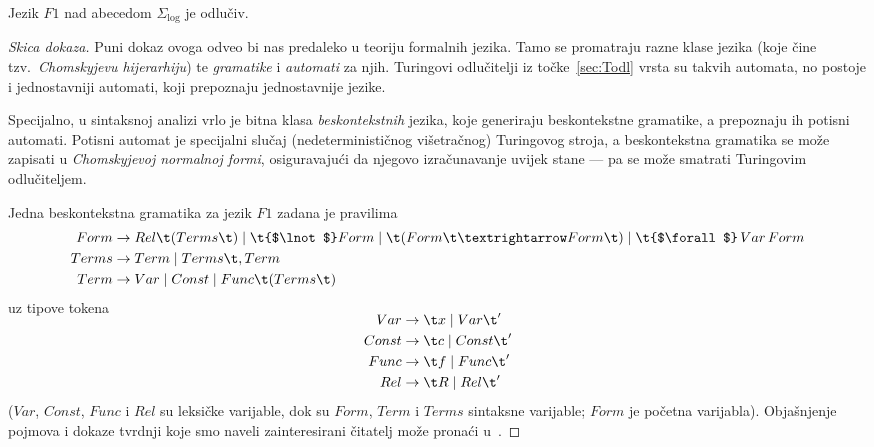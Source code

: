 
\begin{propozicija}[{name=[odlučivost jezika svih formula prvog reda]}]\label{pp:F1odl}
    Jezik $F1$ nad abecedom $\Sigma_{\log}$ je odlučiv\!.
\end{propozicija}
\begin{proof}[Skica dokaza] Puni dokaz ovoga odveo bi nas predaleko u teoriju formalnih jezika. Tamo se promatraju razne klase jezika (koje čine tzv\!.\ \emph{Chomskyjevu hijerarhiju}) te \emph{gramatike} i \emph{automati} za njih. Turingovi odlučitelji iz točke~\ref{sec:Todl} vrsta su takvih automata, no postoje i jednostavniji automati, koji prepoznaju jednostavnije jezike.

Specijalno, u sintaksnoj analizi vrlo je bitna klasa \emph{beskontekstnih} jezika, koje generiraju beskontekstne gramatike, a prepoznaju ih potisni automati. Potisni automat je specijalni slučaj (nedeterminističnog višetračnog) Turingovog stroja, a beskontekstna gramatika se može zapisati u \emph{Chomskyjevoj normalnoj formi}, osiguravajući da njegovo izračunavanje uvijek stane --- pa se može smatrati Turingovim odlučiteljem.

Jedna beskontekstna gramatika za jezik $F1$ zadana je pravilima
\begin{align}
    Form&\to Rel\t(Terms\t)\mid\t{$\lnot$} Form\mid\t(Form\t\textrightarrow Form\t)\mid\t{$\forall$}\,Var\,Form\\
    Terms&\to Term\mid Terms\t,Term\\
    Term&\to Var\mid Const\mid Func\t(Terms\t)
\end{align}
uz tipove tokena
    \begin{align}
	    \SwapAboveDisplaySkip
    Var&\to\t x\mid Var\t'\\
    Const&\to\t c\mid Const\t'\\
    Func&\to\t f\mid Func\t'\\
    Rel&\to\t R\mid Rel\t'
\end{align}
($Var$, $Const$, $Func$ i $Rel$ su leksičke varijable, dok su $Form$, $Term$ i $Terms$ sintaksne varijable; $Form$ je početna varijabla). Objašnjenje pojmova i dokaze tvrdnji koje smo naveli zainteresirani čitatelj može pronaći u~\cite{sipser}.
\end{proof}

